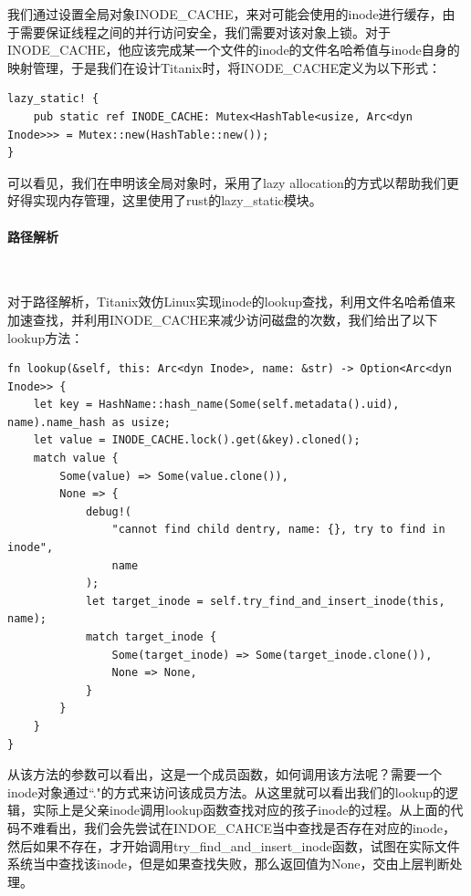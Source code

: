 我们通过设置全局对象INODE\_CACHE，来对可能会使用的inode进行缓存，由于需要保证线程之间的并行访问安全，我们需要对该对象上锁。对于INODE\_CACHE，他应该完成某一个文件的inode的文件名哈希值与inode自身的映射管理，于是我们在设计Titanix时，将INODE\_CACHE定义为以下形式：
\begin{tcolorbox}[
title=\textbf{os/src/fs/inode.rs},
listing only,
breakable
]
\begin{verbatim}
lazy_static! {
    pub static ref INODE_CACHE: Mutex<HashTable<usize, Arc<dyn Inode>>> = Mutex::new(HashTable::new());
}
\end{verbatim}
\end{tcolorbox}
可以看见，我们在申明该全局对象时，采用了lazy allocation的方式以帮助我们更好得实现内存管理，这里使用了rust的lazy\_static模块。

\paragraph{路径解析}~{}

对于路径解析，Titanix效仿Linux实现inode的lookup查找，利用文件名哈希值来加速查找，并利用INODE\_CACHE来减少访问磁盘的次数，我们给出了以下lookup方法：
\begin{tcolorbox}[
title=\textbf{os/src/fs/inode.rs},
listing only,
breakable
]
\begin{verbatim}
fn lookup(&self, this: Arc<dyn Inode>, name: &str) -> Option<Arc<dyn Inode>> {
    let key = HashName::hash_name(Some(self.metadata().uid), name).name_hash as usize;
    let value = INODE_CACHE.lock().get(&key).cloned();
    match value {
        Some(value) => Some(value.clone()),
        None => {
            debug!(
                "cannot find child dentry, name: {}, try to find in inode",
                name
            );
            let target_inode = self.try_find_and_insert_inode(this, name);
            match target_inode {
                Some(target_inode) => Some(target_inode.clone()),
                None => None,
            }
        }
    }
}
\end{verbatim}
\end{tcolorbox}
从该方法的参数可以看出，这是一个成员函数，如何调用该方法呢？需要一个inode对象通过``."的方式来访问该成员方法。从这里就可以看出我们的lookup的逻辑，实际上是父亲inode调用lookup函数查找对应的孩子inode的过程。从上面的代码不难看出，我们会先尝试在INDOE\_CAHCE当中查找是否存在对应的inode，然后如果不存在，才开始调用try\_find\_and\_insert\_inode函数，试图在实际文件系统当中查找该inode，但是如果查找失败，那么返回值为None，交由上层判断处理。

